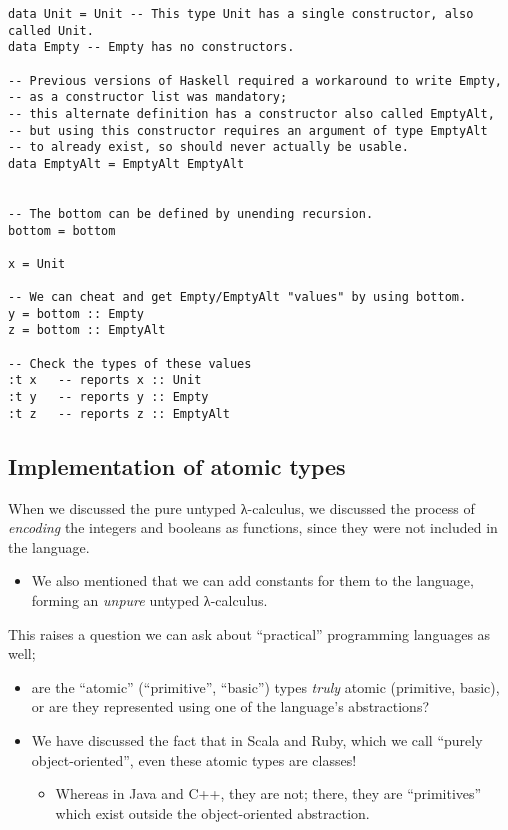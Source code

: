 \documentclass[11pt]{article}
\theoremstyle{definition}
\begin{document}
\begin{verbatim}
data Unit = Unit -- This type Unit has a single constructor, also called Unit.
data Empty -- Empty has no constructors.

-- Previous versions of Haskell required a workaround to write Empty,
-- as a constructor list was mandatory;
-- this alternate definition has a constructor also called EmptyAlt,
-- but using this constructor requires an argument of type EmptyAlt
-- to already exist, so should never actually be usable.
data EmptyAlt = EmptyAlt EmptyAlt


-- The bottom can be defined by unending recursion.
bottom = bottom
  
x = Unit

-- We can cheat and get Empty/EmptyAlt "values" by using bottom.
y = bottom :: Empty
z = bottom :: EmptyAlt

-- Check the types of these values
:t x   -- reports x :: Unit
:t y   -- reports y :: Empty
:t z   -- reports z :: EmptyAlt
\end{verbatim}

\subsection{Implementation of atomic types}
\label{sec:orgb18e59f}

When we discussed the pure untyped λ-calculus,
we discussed the process of \emph{encoding} the integers and booleans
as functions, since they were not included in the language.
\begin{itemize}
\item We also mentioned that we can add constants for them
to the language, forming an \emph{unpure} untyped λ-calculus.
\end{itemize}

This raises a question we can ask about
“practical” programming languages as well;
\begin{itemize}
\item are the “atomic” (“primitive”, “basic”) types \emph{truly} atomic
(primitive, basic), or are they represented
using one of the language's abstractions?
\item We have discussed the fact that in Scala and Ruby, which we call
“purely object-oriented”, even these atomic types are classes!
\begin{itemize}
\item Whereas in Java and C++, they are not;
there, they are “primitives” which exist
outside the object-oriented abstraction.
\end{itemize}
\end{itemize}
\end{document}
